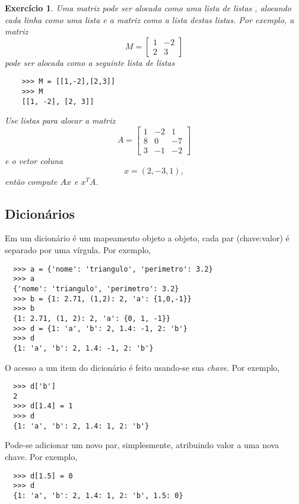 \documentclass[12pt]{article}
\newtheorem{exr}{Exercício}[section]
\begin{document}
\begin{exr}
  Uma matriz pode ser alocada como uma lista de listas {\python}, alocando cada linha como uma lista e a matriz como a lista destas listas. Por exemplo, a matriz
  \begin{equation}
    M =
    \begin{bmatrix}
      1 & -2 \\
      2 & 3
    \end{bmatrix}
  \end{equation}
  pode ser alocada como a seguinte lista de listas
  \begin{lstlisting}
    >>> M = [[1,-2],[2,3]]
    >>> M
    [[1, -2], [2, 3]]
  \end{lstlisting}
  Use listas para alocar a matriz
  \begin{equation}
    A =
    \begin{bmatrix}
      1 & -2 & 1\\
      8 & 0 & -7\\
      3 & -1 & -2
    \end{bmatrix}
  \end{equation}
  e o vetor coluna
  \begin{equation}
    x = (2, -3, 1),
  \end{equation}
  então compute $Ax$ e $x^TA$.
\end{exr}

\subsection{Dicionários}

Em {\python} um dicionário é um mapeamento objeto a objeto, cada par (chave:valor) é separado por uma vírgula. Por exemplo,
\begin{lstlisting}
  >>> a = {'nome': 'triangulo', 'perimetro': 3.2}
  >>> a
  {'nome': 'triangulo', 'perimetro': 3.2}
  >>> b = {1: 2.71, (1,2): 2, 'a': {1,0,-1}}
  >>> b
  {1: 2.71, (1, 2): 2, 'a': {0, 1, -1}}
  >>> d = {1: 'a', 'b': 2, 1.4: -1, 2: 'b'}
  >>> d
  {1: 'a', 'b': 2, 1.4: -1, 2: 'b'}
\end{lstlisting}

O acesso a um item do dicionário é feito usando-se sua \emph{chave}. Por exemplo,
\begin{lstlisting}
  >>> d['b']
  2
  >>> d[1.4] = 1
  >>> d
  {1: 'a', 'b': 2, 1.4: 1, 2: 'b'}
\end{lstlisting}
Pode-se adicionar um novo par, simplesmente, atribuindo valor a uma nova chave. Por exemplo,
\begin{lstlisting}
  >>> d[1.5] = 0
  >>> d
  {1: 'a', 'b': 2, 1.4: 1, 2: 'b', 1.5: 0}
\end{lstlisting}
\end{document}
